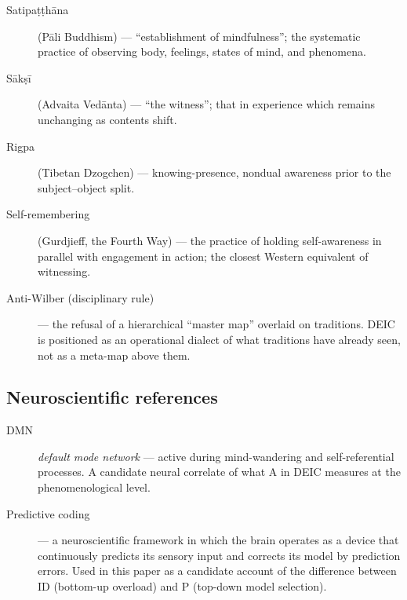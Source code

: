 \begin{description}
    \item[Satipa\d{t}\d{t}h\=ana] (P\=ali Buddhism) --- ``establishment of mindfulness''; the systematic practice of observing body, feelings, states of mind, and phenomena.
    \item[S\=ak\d{s}\=i] (Advaita Ved\=anta) --- ``the witness''; that in experience which remains unchanging as contents shift.
    \item[Rigpa] (Tibetan Dzogchen) --- knowing-presence, nondual awareness prior to the subject--object split.
    \item[Self-remembering] (Gurdjieff, the Fourth Way) --- the practice of holding self-awareness in parallel with engagement in action; the closest Western equivalent of witnessing.
    \item[Anti-Wilber (disciplinary rule)] --- the refusal of a hierarchical ``master map'' overlaid on traditions. DEIC is positioned as an operational dialect of what traditions have already seen, not as a meta-map above them.
\end{description}

\subsection*{Neuroscientific references}

\begin{description}
    \item[DMN] \textit{default mode network} --- active during mind-wandering and self-referential processes. A candidate neural correlate of what A in DEIC measures at the phenomenological level.
    \item[Predictive coding] --- a neuroscientific framework in which the brain operates as a device that continuously predicts its sensory input and corrects its model by prediction errors. Used in this paper as a candidate account of the difference between ID (bottom-up overload) and P (top-down model selection).
\end{description}

\clearpage
